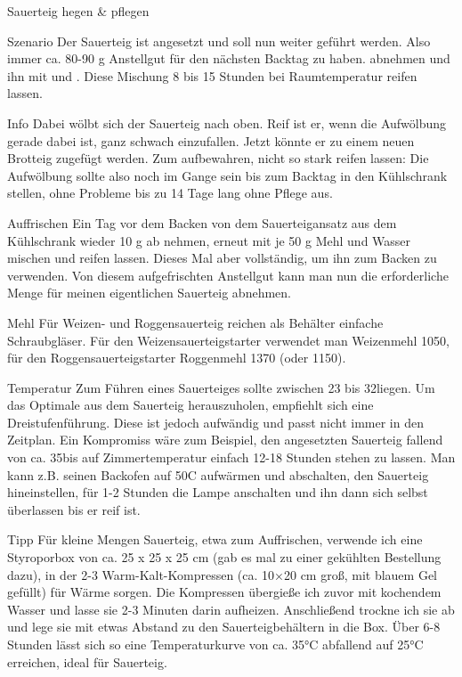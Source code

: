 \begin{recipe}{Sauerteig hegen \& pflegen}
	\item{Szenario} Der Sauerteig ist angesetzt und soll nun weiter geführt werden. Also immer ca. 80-90 g Anstellgut für den nächsten Backtag zu haben. 
	 abnehmen und ihn mit 
	 und 
	. Diese Mischung 8 bis 15 Stunden bei Raumtemperatur reifen lassen. 
	\item[Info] Dabei wölbt sich der Sauerteig nach oben. Reif ist er, wenn die Aufwölbung gerade dabei ist, ganz schwach einzufallen. Jetzt könnte er zu einem neuen Brotteig zugefügt werden. Zum aufbewahren, nicht so stark reifen lassen: Die Aufwölbung sollte also noch im Gange sein bis zum Backtag in den Kühlschrank stellen, ohne Probleme bis zu 14 Tage lang ohne Pflege aus.
	\item[Auffrischen] Ein Tag vor dem Backen von dem Sauerteigansatz aus dem Kühlschrank wieder 10 g ab nehmen, erneut mit je 50 g Mehl und Wasser mischen und reifen lassen. Dieses Mal aber vollständig, um ihn zum Backen zu verwenden. Von diesem aufgefrischten Anstellgut kann man nun die erforderliche Menge für meinen eigentlichen Sauerteig abnehmen.
	\item[Mehl] Für Weizen- und Roggensauerteig reichen als Behälter einfache Schraubgläser. Für den Weizensauerteigstarter verwendet man Weizenmehl 1050, für den Roggensauerteigstarter Roggenmehl 1370 (oder 1150).
	\item[Temperatur] Zum Führen eines Sauerteiges sollte zwischen 23 bis 32\textcelsius liegen. Um das Optimale aus dem Sauerteig herauszuholen, empfiehlt sich eine Dreistufenführung. Diese ist jedoch aufwändig und passt nicht immer in den Zeitplan. Ein Kompromiss wäre zum Beispiel, den angesetzten Sauerteig fallend von ca. 35\textcelsius bis auf Zimmertemperatur einfach 12-18 Stunden stehen zu lassen. Man kann z.B. seinen Backofen auf 50\textcelsius C aufwärmen und abschalten, den Sauerteig hineinstellen, für 1-2 Stunden die Lampe anschalten und ihn dann sich selbst überlassen bis er reif ist.
	\item[Tipp] Für kleine Mengen Sauerteig, etwa zum Auffrischen, verwende ich eine Styroporbox von ca. 25 x 25 x 25 cm (gab es mal zu einer gekühlten Bestellung dazu), in der 2-3 Warm-Kalt-Kompressen (ca. 10×20 cm groß, mit blauem Gel gefüllt) für Wärme sorgen. Die Kompressen übergieße ich zuvor mit kochendem Wasser und lasse sie 2-3 Minuten darin aufheizen. Anschließend trockne ich sie ab und lege sie mit etwas Abstand zu den Sauerteigbehältern in die Box. Über 6-8 Stunden lässt sich so eine Temperaturkurve von ca. 35°C abfallend auf 25°C erreichen, ideal für Sauerteig.
	\author{Plötz, \href{http://www.ploetzblog.de/tipps-und-tricks/sauerteig/}{http://www.ploetzblog.de/tipps-und-tricks/sauerteig/}}
\end{recipe}